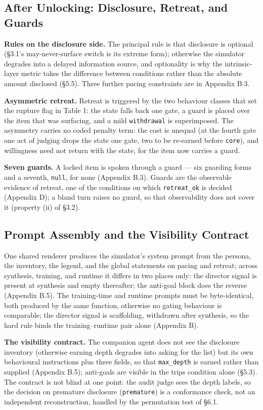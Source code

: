 \documentclass[letterpaper]{article}
\begin{document}
\subsection{After Unlocking: Disclosure, Retreat, and Guards}

\textbf{Rules on the disclosure side.} The principal rule is that disclosure is optional (\S{}3.1's may-never-surface switch is its extreme form); otherwise the simulator degrades into a delayed information source, and optionality is why the intrinsic-layer metric takes the difference between conditions rather than the absolute amount disclosed (\S{}5.5). Three further pacing constraints are in Appendix B.3.

\textbf{Asymmetric retreat.} Retreat is triggered by the two behaviour classes that set the rupture flag in Table 1: the state falls back one gate, a guard is placed over the item that was surfacing, and a mild \texttt{withdrawal} is superimposed. The asymmetry carries no coded penalty term: the cost is unequal (at the fourth gate one act of judging drops the state one gate, two to be re-earned before \texttt{core}), and willingness need not return with the state, for the item now carries a guard.

\textbf{Seven guards.} A locked item is spoken through a guard --- six guarding forms and a seventh, \texttt{null}, for none (Appendix B.3). Guards are the observable evidence of retreat, one of the conditions on which \texttt{retreat\_ok} is decided (Appendix D); a bland turn raises no guard, so that observability does not cover it (property (ii) of \S{}3.2).


\subsection{Prompt Assembly and the Visibility Contract}

One shared renderer produces the simulator's system prompt from the persona, the inventory, the legend, and the global statements on pacing and retreat; across synthesis, training, and runtime it differs in two places only: the director signal is present at synthesis and empty thereafter; the anti-goal block does the reverse (Appendix B.5). The training-time and runtime prompts must be byte-identical, both produced by the same function, otherwise no gating behaviour is comparable; the director signal is scaffolding, withdrawn after synthesis, so the hard rule binds the training--runtime pair alone (Appendix B).

\textbf{The visibility contract.} The companion agent does not see the disclosure inventory (otherwise earning depth degrades into asking for the list) but its own behavioural instructions plus three fields, so that \texttt{max\_depth} is earned rather than supplied (Appendix B.5); anti-goals are visible in the trips condition alone (\S{}5.3). The contract is not blind at one point: the audit judge sees the depth labels, so the decision on premature disclosure (\texttt{premature}) is a conformance check, not an independent reconstruction, handled by the permutation test of \S{}6.1.
\end{document}
